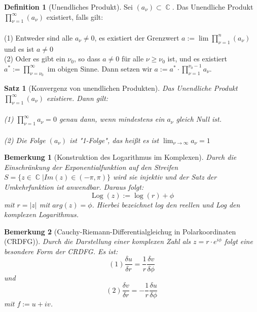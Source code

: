 \documentclass[10pt,a4paper]{article}
\theoremstyle{plain}
\newtheorem{satz}[thm]{Satz}
\newtheorem*{note}{Bemerkung}
\theoremstyle{definition}
\newtheorem{defn}{Definition}[section]
\theoremstyle{remark}
\DeclareMathOperator{\C}{\mathbb{C}}
\DeclareMathOperator{\Log}{Log}
\begin{document}
\begin{defn}[Unendliches Produkt]
Sei $(a_{\nu})\subset \C$. Das Unendliche Produkt $\prod_{\nu = 1 }^{\infty}(a_{\nu})$ existiert, falls gilt:
\\
\\
(1) Entweder sind alle $a_{\nu}\neq 0$, es existiert der Grenzwert $ a := \lim \prod_{\nu = 1}^{n} (a_{\nu})$ und es ist $a \neq 0$
\\
(2) Oder es gibt ein $\nu_{0}$, so dass $a \neq 0$ für alle $\nu \geq \nu_{0}$ ist, und es existiert $a^{*} := \prod_{\nu = \nu_{0}}^{\infty}$ im obigen Sinne. Dann setzen wir $a := a^{*} 
\cdot \prod_{\nu = 1}^{\nu_{0} - 1}a_{\nu}$.

\end{defn}

\begin{satz}[Konvergenz von unendlichen Produkten]

Das Unendliche Produkt $\prod_{\nu = 1 }^{\infty}(a_{\nu})$ existiere. Dann gilt:
\\
\\
(1) $\prod_{\nu = 1}^{\infty}a_{\nu} = 0$ genau dann, wenn mindestens ein $a_{\nu}$ gleich Null ist.
\\
\\
(2) Die Folge $(a_{\nu})$ ist "1-Folge", das heißt es ist $\lim_{\nu \rightarrow\infty}a_{\nu} = 1$

\end{satz}

\begin{note}[Konstruktion des Logarithmus im Komplexen]

Durch die Einschränkung der Exponentialfunktion auf den Streifen $S = \{ z \in \C | Im(z) \in (-\pi, \pi)\}$ wird sie injektiv und der Satz der Umkehrfunktion ist anwendbar. Daraus folgt:$$\Log(z) := \log(r) + \phi$$ mit $r=|z|$ mit $arg(z)= \phi$. Hierbei bezeichnet log den reellen und Log den komplexen Logarithmus.

\end{note}

\begin{note}[Cauchy-Riemann-Differentialgleichug in Polarkoordinaten (CRDFG)]

Durch die Darstellung einer komplexen Zahl als $z = r\cdot e^{i\phi}$ folgt eine besondere Form der CRDFG. Es ist: $$(1) \frac{\delta u}{\delta r} = \frac{1}{r} \frac{\delta v}{\delta \phi}$$ und $$(2)\frac{\delta v}{\delta r} = -\frac{1}{r} \frac{\delta u}{\delta \phi}$$ mit $f := u + iv$.

\end{note}
\end{document}
